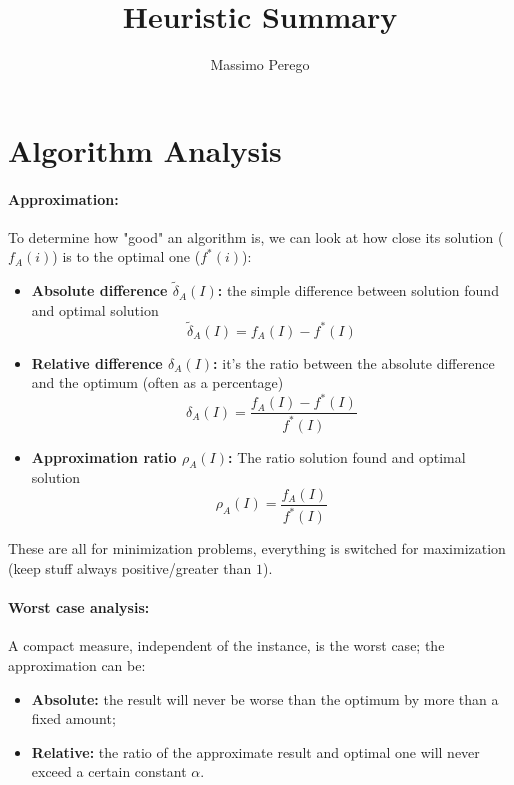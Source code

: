 \documentclass{article}
\title{Heuristic Summary}
\author{Massimo Perego}
\date{}
\begin{document}
	
	\maketitle
	
	
	\section*{Algorithm Analysis}
	
	\paragraph{Approximation:} To determine how "good" an algorithm is, we can look at how close its solution ($f_A (i)$) is to the optimal one ($f^\ast (i)$): 
	\begin{itemize}
		\item \textbf{Absolute difference $\tilde \delta_A(I)$:} the simple difference between solution found and optimal solution
		$$ \tilde{\delta}_A (I) = f_A (I) - f^\ast (I) $$
		\item \textbf{Relative difference $\delta_A (I)$:} it's the ratio between the absolute difference and the optimum (often as a percentage)
		$$ \delta_A(I) = \frac{f_A (I) - f^\ast (I)}{f^\ast (I)} $$
		\item \textbf{Approximation ratio $\rho_A (I)$:} The ratio solution found and optimal solution
		$$ \rho_A (I) = \frac{f_A (I)}{f^\ast (I)} $$
	\end{itemize}
	These are all for minimization problems, everything is switched for maximization (keep stuff always positive/greater than $1$).\\
	
	\paragraph{Worst case analysis:} A compact measure, independent of the instance, is the worst case; the approximation can be: 
	\begin{itemize}
		\item \textbf{Absolute:} the result will never be worse than the optimum by more than a fixed amount;
		\item\textbf{Relative:} the ratio of the approximate result and optimal one will never exceed a certain constant $\alpha$.\\
	\end{itemize}
	
\end{document}
